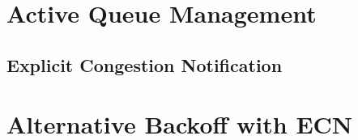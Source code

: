 \section{Active Queue Management}

\subsection{Explicit Congestion Notification}



\section{Alternative Backoff with ECN}

